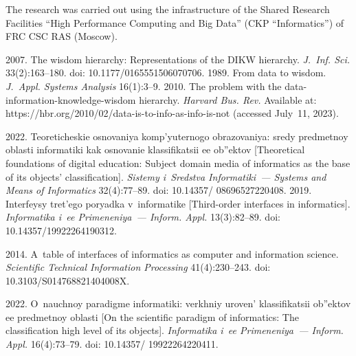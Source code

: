 \Ack

\vspace*{-3pt}

\noindent
The research was carried out using the infrastructure of the Shared Research Facilities ``High Performance 
Computing and Big Data'' (CKP ``Informatics'') of FRC CSC RAS (Moscow).
  


  \begin{multicols}{2}

\renewcommand{\bibname}{\protect\rmfamily References}

{\small\frenchspacing
 {%
 \begin{thebibliography}{99} 
 2007. The wisdom hierarchy: Representations of the DIKW hierarchy. \textit{J.~Inf. Sci.} 
33(2):163--180. doi: 10.1177/0165551506070706.
 1989. From data to wisdom. \textit{J.~Appl. Systems Analysis} 16(1):3--9.
 2010. The problem with the data-information-knowledge-wisdom hierarchy. 
\textit{Harvard Bus. Rev.} Available at: {\sf https://hbr.org/2010/02/data-is-to-info-as-info-is-not} (accessed 
July~11, 2023). 

 2022. Teo\-re\-ti\-che\-skie osno\-va\-niya komp'yu\-ter\-no\-go ob\-ra\-zo\-va\-niya: 
sre\-dy pred\-met\-noy ob\-lasti in\-for\-ma\-ti\-ki kak osno\-va\-nie klas\-si\-fi\-ka\-tsii ee ob''\-ek\-tov 
[Theoretical foundations of digital education: Subject domain media of informatics as the base of its objects' 
classification]. \textit{Sistemy i~Sredstva Informatiki~--- Systems and Means of Informatics} 32(4):77--89. 
doi: 10.14357/ 08696527220408.
 2019. Inter\-fey\-sy tret'\-ego po\-ryad\-ka v~in\-for\-ma\-ti\-ke [Third-order interfaces 
in informatics]. \textit{Informatika i~ee Primeneniya~--- Inform. Appl.} 13(3):82--89. doi: 
10.14357/19922264190312.

 2014. A~table of interfaces of informatics as computer and information science. 
\textit{Scientific Technical Information Processing} 41(4):230--243. doi: 10.3103/S014768821404008X.

 2022. O~na\-uch\-noy pa\-ra\-dig\-me in\-for\-ma\-ti\-ki: verkh\-niy uro\-ven'  
klas\-si\-fi\-ka\-tsii ob''\-ek\-tov ee pred\-met\-noy ob\-lasti [On the scientific paradigm of informatics: The 
classification high level of its objects]. \textit{Informatika i~ee Primeneniya~--- Inform. Appl.} 16(4):73--79. 
doi: 10.14357/ 19922264220411.


\end{thebibliography}}}
\end{multicols}
